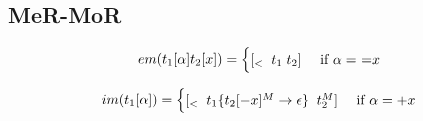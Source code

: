 \documentclass[12pt]{article}
\begin{document}
\begin{landscape}
\newpage

\subsection{MeR-MoR}


\begin{equation}
em(t_1[\alpha]t_2[x])= 
\begin{cases}
[_< \;\; t_1\;t_2] & $ if $\alpha = $ =$x
\end{cases}
\end{equation}

\begin{equation}
im(t_1[\alpha]) =
\begin{cases}
[_< \;\; t_1\{t_2[-x]^M \rightarrow \epsilon\} \;\; t_2^M] & $ if $\alpha = +x \\
\end{cases}
\end{equation}



\end{landscape}
\end{document}
